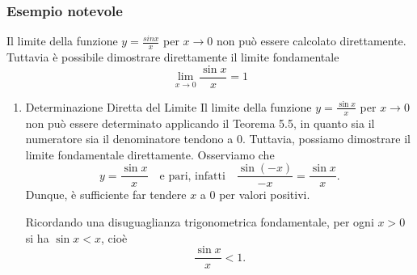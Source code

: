 \documentclass{book}
\begin{document}
\subsubsection{Esempio notevole}
Il limite della funzione  \(y = \frac{sinx}{x} \) per \(x \to 0\) non può essere calcolato direttamente.
Tuttavia è possibile dimostrare direttamente il limite
fondamentale
\[\lim_{x \to 0}\frac{\sin x}{x} = 1\]

\begin{enumerate}
    \item Determinazione Diretta del Limite
          Il limite della funzione \( y = \frac{\sin x}{x} \) per \( x \to 0 \) non può essere determinato applicando il Teorema 5.5, in quanto sia il numeratore sia il denominatore tendono a 0. Tuttavia, possiamo dimostrare il limite fondamentale direttamente. Osserviamo che
          \[
              y = \frac{\sin x}{x} \quad \text{e pari, infatti} \quad \frac{\sin(-x)}{-x} = \frac{\sin x}{x}.
          \]
          Dunque, è sufficiente far tendere \( x \) a 0 per valori positivi.

          Ricordando una disuguaglianza trigonometrica fondamentale, per ogni \( x > 0 \) si ha \( \sin x < x \), cioè
          \[
              \frac{\sin x}{x} < 1.
          \]\\


\end{enumerate}
\end{document}
